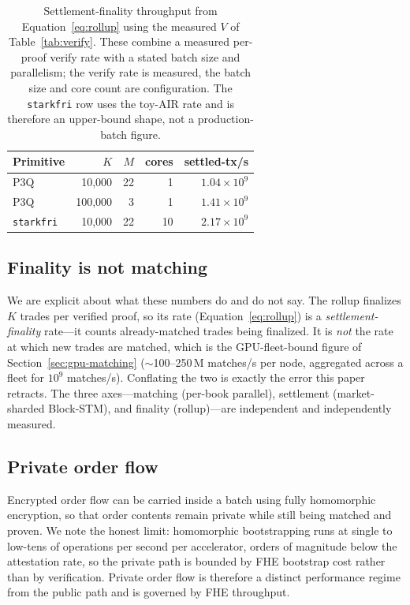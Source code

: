 \begin{table}[H]
\centering
\renewcommand{\arraystretch}{1.25}
\begin{tabular}{l r r r r}
\toprule
\textbf{Primitive} & \textbf{$K$} & \textbf{$M$} & \textbf{cores} & \textbf{settled-tx/s} \\
\midrule
P3Q       & 10{,}000  & 22 & 1  & $1.04\times10^{9}$ \\
P3Q       & 100{,}000 & 3  & 1  & $1.41\times10^{9}$ \\
\texttt{starkfri} & 10{,}000  & 22 & 10 & $2.17\times10^{9}$ \\
\bottomrule
\end{tabular}
\caption{Settlement-finality throughput from Equation~\eqref{eq:rollup} using the measured
$V$ of Table~\ref{tab:verify}. These combine a measured per-proof verify rate with a stated
batch size and parallelism; the verify rate is measured, the batch size and core count are
configuration. The \texttt{starkfri} row uses the toy-AIR rate and is therefore an
upper-bound shape, not a production-batch figure.}
\label{tab:finality}
\end{table}

\subsection{Finality is not matching}

We are explicit about what these numbers do and do not say. The rollup finalizes $K$ trades
per verified proof, so its rate (Equation~\eqref{eq:rollup}) is a \emph{settlement-finality}
rate---it counts already-matched trades being finalized. It is \emph{not} the rate at which
new trades are matched, which is the GPU-fleet-bound figure of Section~\ref{sec:gpu-matching}
($\sim$100--250\,M matches/s per node, aggregated across a fleet for $10^{9}$ matches/s).
Conflating the two is exactly the error this paper retracts. The three axes---matching
(per-book parallel), settlement (market-sharded Block-STM), and finality (rollup)---are
independent and independently measured.

\subsection{Private order flow}

Encrypted order flow can be carried inside a batch using fully homomorphic encryption, so
that order contents remain private while still being matched and proven. We note the honest
limit: homomorphic bootstrapping runs at single to low-tens of operations per second per
accelerator, orders of magnitude below the attestation rate, so the private path is bounded
by FHE bootstrap cost rather than by verification. Private order flow is therefore a distinct
performance regime from the public path and is governed by FHE throughput.
